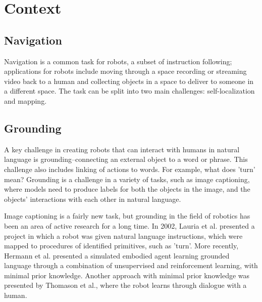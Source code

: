 \documentclass{article}
\begin{document}

\section{Context}
\subsection{Navigation}
Navigation is a common task for robots, a subset of instruction following; applications for robots include moving through a space recording or streaming video back to a human and collecting objects in a space to deliver to someone in a different space. The task can be split into two main challenges: self-localization and mapping\cite{Wallgrun:2007zr}. 

\subsection{Grounding}
A key challenge in creating robots that can interact with humans in natural language is grounding--connecting an external object to a word or phrase. This challenge also includes linking of actions to words. For example, what does 'turn' mean? Grounding is a challenge in a variety of tasks, such as image captioning, where models need to produce labels for both the objects in the image, and the objects' interactions with each other in natural language\cite{karpathy2014captioning}.


Image captioning is a fairly new task, but grounding in the field of robotics has been an area of active research for a long time. In 2002, Lauria et al. presented a project in which a robot was given natural language instructions, which were mapped to procedures of identified primitives, such as 'turn'\cite{lauria2002}. More recently, Hermann et al. presented a simulated embodied agent learning grounded language through a combination of unsupervised and reinforcement learning, with minimal prior knowledge\cite{hermann2017grounded}. Another approach with minimal prior knowledge was presented by Thomason et al., where the robot learns through dialogue with a human\cite{thomason2019grounded}.
\end{document}
